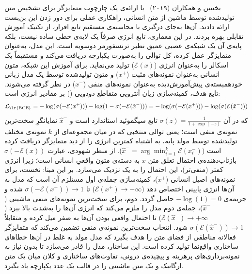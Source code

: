 بختیین و همکاران (۲۰۱۹)~\cite{bakhtin2019realfake} با ارائه‌ی یک چارچوب متمایزگر برای تشخیص متن تولیدشده توسط ماشین از متن انسانی، راهکاری عملی برای دور زدن این بن‌بست ارائه دادند. آن‌ها به‌جای درگیری با محاسبه‌ی مستقیم تابع افراز، از تکنیک آموزش تقابلی بهره بردند. در این معماری، تابع انرژی صرفاً یک لایه‌ی خطی ساده نیست، بلکه پایه‌ی آن یک شبکه‌ی عصبی عمیق نظیر ترنسفورمر دوسویه است. این مدل، به‌عنوان متمایزگر عمل کرده، کل توالی را به‌صورت یکپارچه دریافت می‌کند و مستقیماً یک اسکالر را به‌عنوان انرژی ($\mathcal{E}(x)$) تولید می‌نماید. برای آموزش این شبکه، متون انسانی به‌عنوان نمونه‌های مثبت ($x^+$) و متون تولیدشده توسط یک مدل زبانی خودهمبسته‌ی پیش‌آموزش‌دیده به‌عنوان نمونه‌های منفی ($x^-$) در نظر گرفته می‌شوند. تابع هدف، کمینه‌سازی زیان آنتروپی متقاطع دودویی () بر مقادیر انرژی است:
\begin{equation}\label{eq:chap3_nlp_ebm_bce}
    \mathcal{L}_{\text{\lr{BCE}}} = -\log(\sigma(-\mathcal{E}(x^+))) - \log(1 - \sigma(-\mathcal{E}(\hat{x}^-))) = -\log(\sigma(-\mathcal{E}(x^+))) - \log(\sigma(\mathcal{E}(\hat{x}^-)))
\end{equation}
که در آن $\sigma(z) = \frac{1}{1 + \exp(-z)}$ تابع سیگموئید استاندارد است و $\hat{x}^-$ نمایانگرِ سخت‌ترین نمونه‌ی منفی است؛ یعنی توالی منتخبی که در میان مجموعه‌ای از $k$ نمونه‌ی مختلف تولیدشده توسط مولد پایه، به اشتباه کمترین انرژی را از دید متمایزگر دریافت کرده است ($\hat{x}^- = \arg\min_{i=1}^k \mathcal{E}(x^-_i)$). از منظر شهودی، عبارت $\sigma(-\mathcal{E}(x))$ بازتاب‌دهنده‌ی احتمال تعلق متن $x$ به دسته‌ی متون واقعیِ انسانی است؛ زیرا انرژی کمتر (منفی‌تر)، این احتمال را به یک نزدیک می‌سازد. بر این مبنا:
نخست، برای نمونه‌های اصیل انسانی ($x^+$)، کمینه‌سازی جمله‌ی اول مستلزم آن است که مدل به آن‌ها انرژی پایینی اختصاص دهد ($\mathcal{E}(x^+) \to -\infty$) تا $\sigma(-\mathcal{E}(x^+)) \to 1$ شده و جریمه‌ی $-\log(1) = 0$ حاصل گردد.
دوم، برای سخت‌ترین نمونه‌های منفی ماشینی ($\hat{x}^-$)، جمله‌ی دوم مدل را ملزم می‌کند که انرژی آن‌ها را به‌شدت بالا ببرد ($\mathcal{E}(\hat{x}^-) \to +\infty$) تا احتمال واقعی بودن آن‌ها به صفر میل کرده و متقابلاً $\sigma(\mathcal{E}(\hat{x}^-)) \to 1$ شود.
انتخاب سخت‌ترین نمونه‌ی منفی تضمین می‌کند که متمایزگر فعالانه مناطقی از فضای متن را هدف بگیرد که مدل مولد به غلط در آن‌ها خطاهای ساختاری واقع‌نما تولید کرده است. این ساختار، مدل را قادر می‌سازد تا بدون نیاز به نمونه‌برداری‌های پرهزینه و پیچیده‌ی درونی، تفاوت‌های ساختاری و کلان میان یک متن ارگانیک و یک متن ماشینی را در قالب یک عدد یکپارچه یاد بگیرد.

